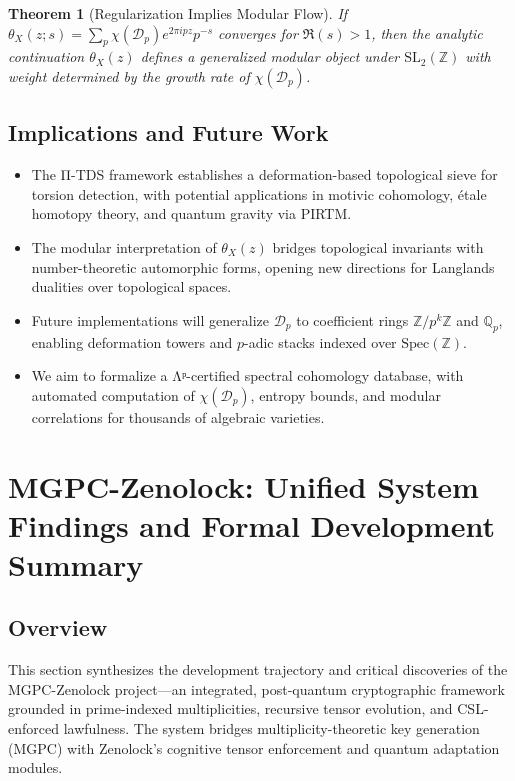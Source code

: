 \documentclass[12]{amsart}
\theoremstyle{plain}
\newtheorem{theorem}{Theorem}[section]
\begin{document}
\begin{theorem}[Regularization Implies Modular Flow]
If $\theta_X(z; s) = \sum_p \chi(\mathcal{D}_p) e^{2\pi i p z} p^{-s}$ converges for $\Re(s) > 1$, then the analytic continuation $\theta_X(z)$ defines a generalized modular object under $\mathrm{SL}_2(\mathbb{Z})$ with weight determined by the growth rate of $\chi(\mathcal{D}_p)$.
\end{theorem}

\subsection{Implications and Future Work}

\begin{itemize}
    \item The Π-TDS framework establishes a deformation-based topological sieve for torsion detection, with potential applications in motivic cohomology, étale homotopy theory, and quantum gravity via PIRTM.

    \item The modular interpretation of $\theta_X(z)$ bridges topological invariants with number-theoretic automorphic forms, opening new directions for Langlands dualities over topological spaces.

    \item Future implementations will generalize $\mathcal{D}_p$ to coefficient rings $\mathbb{Z}/p^k\mathbb{Z}$ and $\mathbb{Q}_p$, enabling deformation towers and $p$-adic stacks indexed over $\mathrm{Spec}(\mathbb{Z})$.

    \item We aim to formalize a Λᵖ-certified spectral cohomology database, with automated computation of $\chi(\mathcal{D}_p)$, entropy bounds, and modular correlations for thousands of algebraic varieties.

\end{itemize}
\section{MGPC-Zenolock: Unified System Findings and Formal Development Summary}

\subsection{Overview}

This section synthesizes the development trajectory and critical discoveries of the MGPC-Zenolock project—an integrated, post-quantum cryptographic framework grounded in prime-indexed multiplicities, recursive tensor evolution, and CSL-enforced lawfulness. The system bridges multiplicity-theoretic key generation (MGPC) with Zenolock's cognitive tensor enforcement and quantum adaptation modules.
\end{document}
